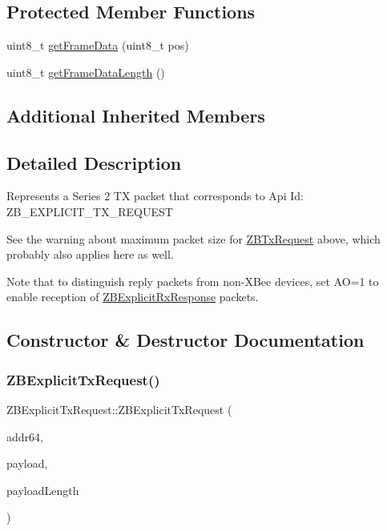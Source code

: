 \subsection*{Protected Member Functions}
\begin{DoxyCompactItemize}
\item 
uint8\+\_\+t \hyperlink{class_z_b_explicit_tx_request_a3d961e023bcf422543f65ed04da2240a}{get\+Frame\+Data} (uint8\+\_\+t pos)
\item 
uint8\+\_\+t \hyperlink{class_z_b_explicit_tx_request_a2dfcaf9ec7520f129b68966f814e318f}{get\+Frame\+Data\+Length} ()
\end{DoxyCompactItemize}
\subsection*{Additional Inherited Members}


\subsection{Detailed Description}
Represents a Series 2 TX packet that corresponds to Api Id\+: Z\+B\+\_\+\+E\+X\+P\+L\+I\+C\+I\+T\+\_\+\+T\+X\+\_\+\+R\+E\+Q\+U\+E\+ST

See the warning about maximum packet size for \hyperlink{class_z_b_tx_request}{Z\+B\+Tx\+Request} above, which probably also applies here as well.

Note that to distinguish reply packets from non-\/\+X\+Bee devices, set AO=1 to enable reception of \hyperlink{class_z_b_explicit_rx_response}{Z\+B\+Explicit\+Rx\+Response} packets. 

\subsection{Constructor \& Destructor Documentation}
\hypertarget{class_z_b_explicit_tx_request_af3070c2fb34934aa3c4cdeb3d0c96429}{}\label{class_z_b_explicit_tx_request_af3070c2fb34934aa3c4cdeb3d0c96429} 
\subsubsection{\texorpdfstring{Z\+B\+Explicit\+Tx\+Request()}{ZBExplicitTxRequest()}\hspace{0.1cm}{\footnotesize\ttfamily [1/3]}}
{\footnotesize\ttfamily Z\+B\+Explicit\+Tx\+Request\+::\+Z\+B\+Explicit\+Tx\+Request (\begin{DoxyParamCaption}\item[{\hyperlink{class_x_bee_address64}{X\+Bee\+Address64} \&}]{addr64,  }\item[{uint8\+\_\+t $\ast$}]{payload,  }\item[{uint8\+\_\+t}]{payload\+Length }\end{DoxyParamCaption})}

